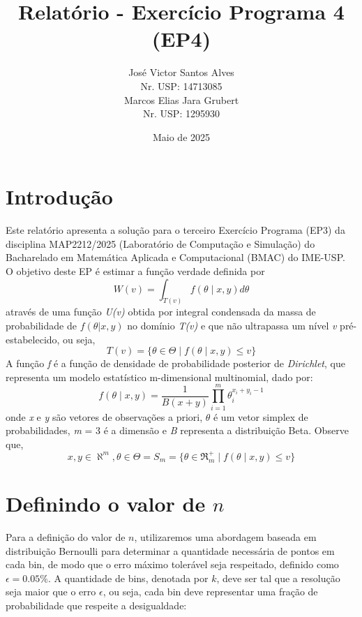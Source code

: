 \documentclass[12pt, a4paper]{article}
\title{Relatório - Exercício Programa 4 (EP4)}
\author{José Victor Santos Alves \\ Nr. USP: 14713085 \\ Marcos Elias Jara Grubert\\ Nr. USP: 1295930}
\date{Maio de 2025}
\begin{document}
\maketitle

\section{Introdução}

Este relatório apresenta a solução para o terceiro Exercício Programa (EP3) da disciplina MAP2212/2025 (Laboratório de Computação e Simulação) do Bacharelado em Matemática Aplicada e Computacional (BMAC) do IME-USP. \\
O objetivo deste EP é estimar a função verdade definida por
\begin{equation}
    W(v)= \int_{T(v)} f(\theta\mid x,y)d\theta 
\end{equation}
através de uma função \textit{U(v)} obtida por integral condensada da massa de probabilidade de $f(\theta|x,y)$ no domínio \textit {T(v)} e que não ultrapassa um nível \textit{v} pré-estabelecido, ou seja,
\begin{equation}
    T(v)=\{ \theta  \in   \Theta  \mid f(\theta\mid x,y)\leq v\}
\end{equation}
A função \textit{f} é a função de densidade de probabilidade posterior de \textit{Dirichlet}, que representa um modelo estatístico m-dimensional multinomial, dado por:
\begin{equation}
    f(\theta\mid x,y) =  \frac{1}{B(x+y)}  \prod_{i=1}^m  \theta_i^{x_i+y_i-1} 
\end{equation}
onde \textit{x} e \textit{y} são vetores de observações a priori, $\theta$ é um vetor simplex de probabilidades, \textit{m} = 3 é a dimensão e \textit{B} representa a distribuição Beta. Observe que, 
\begin{equation}
    x,y \in   \aleph ^m,  \theta  \in  \Theta =S_m=\{ \theta  \in  \Re _m^+ \mid f(\theta\mid x,y)\leq v\}
\end{equation}

\section{Definindo o valor de \( n \)}

Para a definição do valor de \( n \), utilizaremos uma abordagem baseada em distribuição Bernoulli para determinar a quantidade necessária de pontos em cada bin, de modo que o erro máximo tolerável seja respeitado, definido como \( \epsilon = 0.05\% \). A quantidade de bins, denotada por \( k \), deve ser tal que a resolução seja maior que o erro \( \epsilon \), ou seja, cada bin deve representar uma fração de probabilidade que respeite a desigualdade:
\end{document}
